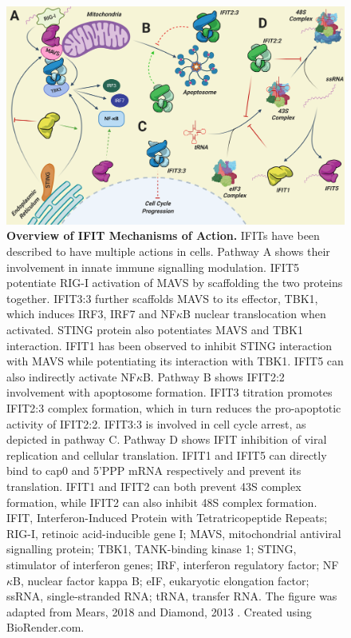 \begin{figure}
    \centering
    \includegraphics[width=1\linewidth]{04. Introduction//Figs/06. IFIT Mechanism of Action.png}
    \caption[Overview of IFIT Mechanisms of Action.]{\textbf{Overview of IFIT Mechanisms of Action.} IFITs have been described to have multiple actions in cells. Pathway A shows their involvement in innate immune signalling modulation. IFIT5 potentiate RIG-I activation of MAVS by scaffolding the two proteins together. IFIT3:3 further scaffolds MAVS to its effector, TBK1, which induces IRF3, IRF7 and NF\(\kappa\)B nuclear translocation when activated. STING protein also potentiates MAVS and TBK1 interaction. IFIT1 has been observed to inhibit STING interaction with MAVS while potentiating its interaction with TBK1. IFIT5 can also indirectly activate NF\(\kappa\)B. Pathway B shows IFIT2:2 involvement with apoptosome formation. IFIT3 titration promotes IFIT2:3 complex formation, which in turn reduces the pro-apoptotic activity of IFIT2:2. IFIT3:3 is involved in cell cycle arrest, as depicted in pathway C. Pathway D shows IFIT inhibition of viral replication and cellular translation. IFIT1 and IFIT5 can directly bind to cap0 and 5’PPP mRNA respectively and prevent its translation. IFIT1 and IFIT2 can both prevent 43S complex formation, while IFIT2 can also inhibit 48S complex formation. IFIT, Interferon-Induced Protein with Tetratricopeptide Repeats; RIG-I, retinoic acid-inducible gene I; MAVS, mitochondrial antiviral signalling protein; TBK1, TANK-binding kinase 1; STING, stimulator of interferon genes; IRF, interferon regulatory factor; NF\(\kappa\)B, nuclear factor kappa B; eIF, eukaryotic elongation factor; ssRNA, single-stranded RNA; tRNA, transfer RNA. The figure was adapted from Mears, 2018 \cite{Mears2018BetterResponse} and Diamond, 2013 \cite{Diamond2013TheProteins}. Created using BioRender.com.}
    \label{fig:Overview of IFIT Mechanisms of Action}
\end{figure}

